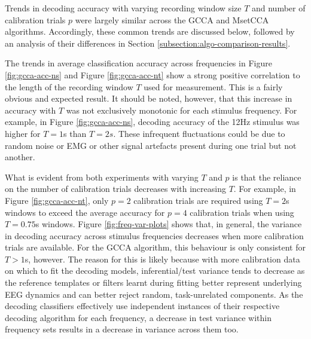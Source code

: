 Trends in decoding accuracy with varying recording window size $T$ and number of calibration trials $p$ were largely similar across the GCCA and MsetCCA algorithms. Accordingly, these common trends are discussed below, followed by an analysis of their differences in Section \ref{subsection:algo-comparison-results}.

The trends in average classification accuracy across frequencies in Figure \ref{fig:gcca-acc-ns} and Figure \ref{fig:gcca-acc-nt} show a strong positive correlation to the length of the recording window $T$ used for measurement. This is a fairly obvious and expected result. It should be noted, however, that this increase in accuracy with $T$ was not exclusively monotonic for each stimulus frequency. For example, in Figure \ref{fig:gcca-acc-ns}, decoding accuracy of the 12Hz stimulus was higher for $T=1$s than $T=2s$. These infrequent fluctuations could be due to random noise or EMG or other signal artefacts present during one trial but not another. 

What is evident from both experiments with varying $T$ and $p$ is that the reliance on the number of calibration trials decreases with increasing $T$. For example, in Figure \ref{fig:gcca-acc-nt}, only $p=2$ calibration trials are required using $T=2$s windows to exceed the average accuracy for $p=4$ calibration trials when using $T=0.75$s windows. Figure \ref{fig:freq-var-plots} shows that, in general, the variance in decoding accuracy across stimulus frequencies decreases when more calibration trials are available. For the GCCA algorithm, this behaviour is only consistent for $T>1$s, however. The reason for this is likely because with more calibration data on which to fit the decoding models, inferential/test variance tends to decrease as the reference templates or filters learnt during fitting better represent underlying EEG dynamics and can better reject random, task-unrelated components. As the decoding classifiers effectively use independent instances of their respective decoding algorithm for each frequency, a decrease in test variance within frequency sets results in a decrease in variance across them too.


